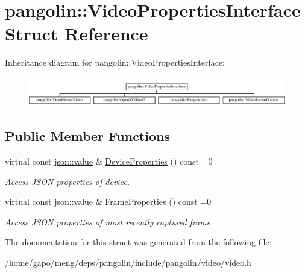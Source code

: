 \hypertarget{structpangolin_1_1_video_properties_interface}{}\section{pangolin\+:\+:Video\+Properties\+Interface Struct Reference}
\label{structpangolin_1_1_video_properties_interface}
Inheritance diagram for pangolin\+:\+:Video\+Properties\+Interface\+:\begin{figure}[H]
\begin{center}
\leavevmode
\includegraphics[height=1.302326cm]{structpangolin_1_1_video_properties_interface}
\end{center}
\end{figure}
\subsection*{Public Member Functions}
\begin{DoxyCompactItemize}
\item 
virtual const \hyperlink{classpangolin_1_1json_1_1value}{json\+::value} \& \hyperlink{structpangolin_1_1_video_properties_interface_a2ce9097dedff1054be1e9470e56138f8}{Device\+Properties} () const =0\hypertarget{structpangolin_1_1_video_properties_interface_a2ce9097dedff1054be1e9470e56138f8}{}\label{structpangolin_1_1_video_properties_interface_a2ce9097dedff1054be1e9470e56138f8}

\begin{DoxyCompactList}\small\item\em Access J\+S\+ON properties of device. \end{DoxyCompactList}\item 
virtual const \hyperlink{classpangolin_1_1json_1_1value}{json\+::value} \& \hyperlink{structpangolin_1_1_video_properties_interface_a15f6a53da5efc65fa8b5eb22d8290c4b}{Frame\+Properties} () const =0\hypertarget{structpangolin_1_1_video_properties_interface_a15f6a53da5efc65fa8b5eb22d8290c4b}{}\label{structpangolin_1_1_video_properties_interface_a15f6a53da5efc65fa8b5eb22d8290c4b}

\begin{DoxyCompactList}\small\item\em Access J\+S\+ON properties of most recently captured frame. \end{DoxyCompactList}\end{DoxyCompactItemize}


The documentation for this struct was generated from the following file\+:\begin{DoxyCompactItemize}
\item 
/home/gapo/meng/deps/pangolin/include/pangolin/video/video.\+h\end{DoxyCompactItemize}
